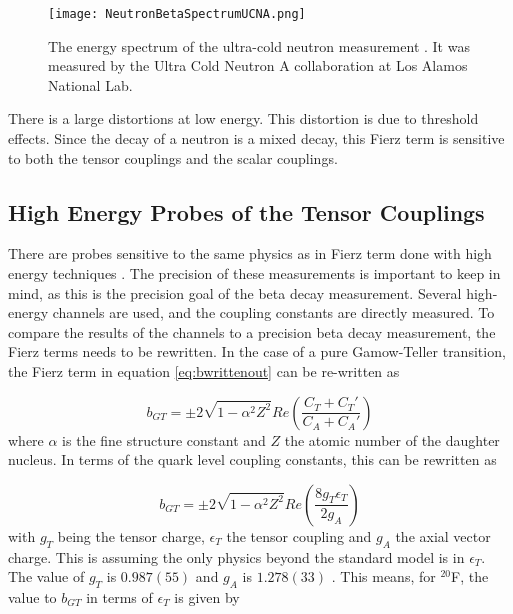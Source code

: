 \documentclass[../MaxHughesThesis.tex]{subfiles}
\begin{document}
\begin{figure}[!htb]
        \centerline{\texttt{[image: NeutronBetaSpectrumUCNA.png]}}
        \caption{The energy spectrum of the ultra-cold neutron measurement \cite{Hic17}.
        	 It was measured by the Ultra Cold Neutron A collaboration at Los Alamos National Lab.}
	\label{fig:ucnabeta}
\end{figure}

There is a large distortions at low energy.
This distortion is due to threshold effects.
Since the decay of a neutron is a mixed decay, this Fierz term is sensitive to both the tensor couplings and the scalar couplings.

\subsection{High Energy Probes of the Tensor Couplings} 

There are probes sensitive to the same physics as in Fierz term done with high energy techniques \cite{Gon19}.
The precision of these measurements is important to keep in mind, as this is the precision goal of the beta decay measurement.
Several high-energy channels are used, and the coupling constants are directly measured.
To compare the results of the channels to a precision beta decay measurement, the Fierz terms needs to be rewritten.
In the case of a pure Gamow-Teller transition, the Fierz term in equation \ref{eq:bwrittenout} can be re-written as %

\begin{equation}
	b_{GT} = \pm 2 \sqrt{1 - \alpha^{2} Z^{2}} Re \left(\frac{C_{T} + C_{T}'}{C_{A} + C_{A}'}\right)
	\label{eq:bgt}
\end{equation}
where $\alpha$ is the fine structure constant and $Z$ the atomic number of the daughter nucleus.
In terms of the quark level coupling constants, this can be rewritten as \cite{Gon19} %

\begin{equation}
	b_{GT} = \pm 2 \sqrt{1 - \alpha^{2} Z^{2}} Re \left(\frac{8 g_{T} \epsilon_{T}}{2 g_{A}}\right)
	\label{eq:bgtquarklevel}
\end{equation}
with $g_{T}$ being the tensor charge, $\epsilon_{T}$ the tensor coupling and $g_{A}$ the axial vector charge.
This is assuming the only physics beyond the standard model is in $\epsilon_{T}$.
The value of $g_{T}$ is $0.987(55)$ and $g_{A}$ is  $1.278 (33)$ \cite{Gon19}.
This means, for $^{20}$F, the value to $b_{GT}$ in terms of $\epsilon_{T}$ is given by %
\end{document}
